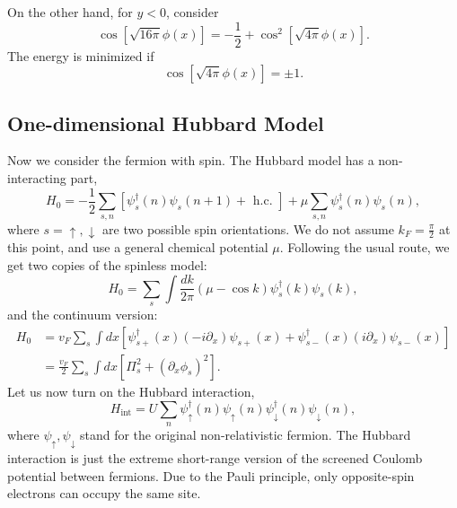On the other hand, for $y<0$, consider
\begin{equation}
	\cos\left[\sqrt{16\pi}\phi(x)\right] = -\frac{1}{2} + \cos^2\left[\sqrt{4\pi}\phi(x)\right].
\end{equation}
The energy is minimized if 
\begin{equation}
	\cos\left[\sqrt{4\pi}\phi(x)\right] = \pm 1.
\end{equation}




\subsection{One-dimensional Hubbard Model}
Now we consider the fermion with spin.
The Hubbard model has a non-interacting part,
\begin{equation}
	H_{0}=-\frac{1}{2} \sum_{s, n}\left[\psi_{s}^{\dagger}(n) \psi_{s}(n+1)+\text { h.c. }\right]+\mu \sum_{s, n} \psi_{s}^{\dagger}(n) \psi_{s}(n),
\end{equation}
where $s=\uparrow, \downarrow$ are two possible spin orientations. We do not assume $k_F = \frac{\pi}{2}$ at this point, and use a general chemical potential $\mu$.
Following the usual route, we get two copies of the spinless model:
\begin{equation}
	H_{0}=\sum_{s} \int \frac{d k}{2 \pi} (\mu-\cos k) \psi_{s}^{\dagger}(k) \psi_{s}(k),
\end{equation}
and the continuum version:
\begin{equation}
\begin{aligned}
	H_0 &= v_F \sum_{s} \int d x \left[
		\psi_{s+}^{\dagger}(x)\left(-i \partial_{x}\right) \psi_{s+}(x) +
		\psi_{s-}^{\dagger}(x)\left( i \partial_{x}\right) \psi_{s-}(x)
	\right] \\
	&= \frac{v_F}{2} \sum_s \int d x \left[\Pi_{s}^{2}+\left(\partial_x \phi_{s}\right)^{2}\right].
\end{aligned}
\end{equation}
Let us now turn on the Hubbard interaction,
\begin{equation}
	H_{\mathrm{int}}=U \sum_{n} \psi_{\uparrow}^{\dagger}(n) \psi_{\uparrow}(n) \psi_{\downarrow}^{\dagger}(n) \psi_{\downarrow}(n),
\end{equation}
where $\psi_{\uparrow}, \psi_{\downarrow}$ stand for the original non-relativistic fermion. 
The Hubbard interaction is just the extreme short-range version of the screened Coulomb potential between fermions. 
Due to the Pauli principle, only opposite-spin electrons can occupy the same site.


